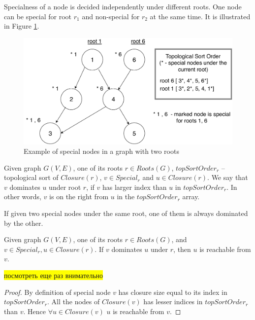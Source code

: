 \documentclass{svproc}
\newcommand{\FIXME}[1]{ %
	\colorbox{yellow}{#1}
}
\newcommand{\FIXME}[1]{ %
}
\begin{document}
\begin{remark}
    Specialness of a node is decided independently under different roots. One node can be special for root $r_1$ and non-special for $r_2$ at
    the same time. It is illustrated in Figure \ref{fig:specialnodes}.
\end{remark}

\begin{figure}[H]
	\includegraphics[width=\linewidth]{specialnodes.pdf}
	\caption{Example of special nodes in a graph with two roots}
	\label{fig:specialnodes}
\end{figure}

\begin{definition}
    Given graph $G(V, E)$, one of its roots $r \in Roots(G)$, $topSortOrder_r$ -- topological sort of $Closure(r)$,
    $v \in Special_r$ and $u \in Closure(r)$. We say that $v$ dominates $u$ under root $r$, if $v$ has larger index than $u$ in $topSortOrder_r$. In other words, $v$ is on the right from $u$ in the $topSortOrder_r$ array.
\end{definition}

\begin{remark}
    If given two special nodes under the same root, one of them is always dominated by the other.
\end{remark}

\begin{theorem}
    Given graph $G(V,E)$, one of its roots $r \in Roots(G)$, and $v \in Special_r, u \in Closure(r)$.
    If $v$ dominates $u$ under $r$, then $u$ is reachable from $v$.
\end{theorem}

\FIXME{посмотреть еще раз внимательно}
\begin{proof}
    By definition of special node $v$ has closure size equal to its index in $topSortOrder_r$. All the nodes of $Closure(v)$ has lesser indices 
    in $topSortOrder_r$ than $v$. Hence $\forall u \in Closure(v)$ $u$ is reachable from $v$.
\end{proof}
\end{document}
